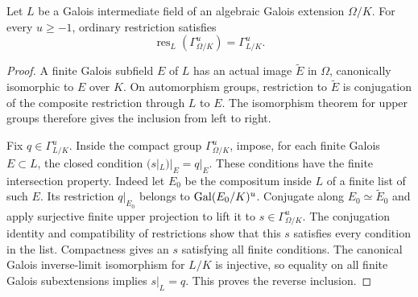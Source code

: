 \begin{lemma}
\label{fw:infinite-upper-restriction}
\leanok
Let $L$ be a Galois intermediate field of an algebraic Galois extension
$\Omega/K$. For every $u\geq-1$, ordinary restriction satisfies
\[
 \operatorname{res}_{L}(\Gamma_{\Omega/K}^u)=\Gamma_{L/K}^u.
\]
\end{lemma}
\begin{proof}
A finite Galois subfield $E$ of $L$ has an actual image $\widetilde E$
in $\Omega$, canonically isomorphic to $E$ over $K$. On automorphism
groups, restriction to $\widetilde E$ is conjugation of the composite
restriction through $L$ to $E$. The isomorphism theorem for upper groups
therefore gives the inclusion from left to right.

Fix $q\in\Gamma_{L/K}^u$. Inside the compact group
$\Gamma_{\Omega/K}^u$, impose, for each finite Galois $E\subset L$, the
closed condition $(s|_L)|_E=q|_E$. These conditions have the finite
intersection property. Indeed let $E_0$ be the compositum inside $L$
of a finite list of such $E$. Its restriction $q|_{E_0}$ belongs to
$\operatorname{Gal}(E_0/K)^u$. Conjugate along $E_0\simeq\widetilde E_0$ and apply
surjective finite upper projection to lift it to
$s\in\Gamma_{\Omega/K}^u$. The conjugation identity and compatibility
of restrictions show that this $s$ satisfies every condition in the list.
Compactness gives an $s$ satisfying all finite conditions. The canonical
Galois inverse-limit isomorphism for $L/K$ is injective, so equality on
all finite Galois subextensions implies $s|_L=q$. This proves the reverse
inclusion.
\end{proof}

